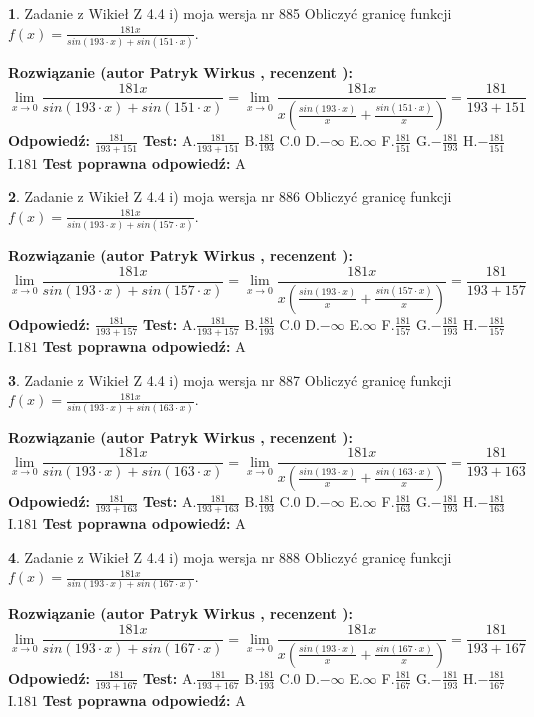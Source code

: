 \documentclass[12pt, a4paper]{article}
\theoremstyle{definition} %
\newtheorem{zad}{}
\newcommand{\zadStart}[1]{\begin{zad}#1\newline}
\newcommand{\zadStop}{\end{zad}}
\newcommand{\rozwStart}[2]{\noindent \textbf{Rozwiązanie (autor #1 , recenzent #2): }\newline}
\newcommand{\rozwStop}{\newline}
\newcommand{\odpStart}{\noindent \textbf{Odpowiedź:}\newline}
\newcommand{\odpStop}{\newline}
\newcommand{\testStart}{\noindent \textbf{Test:}\newline}
\newcommand{\testStop}{\newline}
\newcommand{\kluczStart}{\noindent \textbf{Test poprawna odpowiedź:}\newline}
\newcommand{\kluczStop}{\newline}
\begin{document}
\zadStart{Zadanie z Wikieł Z 4.4 i) moja wersja nr 885}
Obliczyć granicę funkcji $f(x)=\frac{181x}{sin(193\cdot x) +sin(151\cdot x)}$.
\zadStop
\rozwStart{Patryk Wirkus}{}
$$\lim\limits_{x\to 0}\frac{181x}{sin(193\cdot x) +sin(151\cdot x)}=\lim\limits_{x\to 0}\frac{181x}{x(\frac{sin(193\cdot x)}{x}+\frac{sin(151\cdot x)}{x})}=\frac{181}{193+151}$$
\rozwStop
\odpStart
$\frac{181}{193+151}$
\odpStop
\testStart
A.$\frac{181}{193+151}$
B.$\frac{181}{193}$
C.$0$
D.$-\infty$
E.$\infty$
F.$\frac{181}{151}$
G.$-\frac{181}{193}$
H.$-\frac{181}{151}$
I.$181$
\testStop
\kluczStart
A
\kluczStop



\zadStart{Zadanie z Wikieł Z 4.4 i) moja wersja nr 886}
Obliczyć granicę funkcji $f(x)=\frac{181x}{sin(193\cdot x) +sin(157\cdot x)}$.
\zadStop
\rozwStart{Patryk Wirkus}{}
$$\lim\limits_{x\to 0}\frac{181x}{sin(193\cdot x) +sin(157\cdot x)}=\lim\limits_{x\to 0}\frac{181x}{x(\frac{sin(193\cdot x)}{x}+\frac{sin(157\cdot x)}{x})}=\frac{181}{193+157}$$
\rozwStop
\odpStart
$\frac{181}{193+157}$
\odpStop
\testStart
A.$\frac{181}{193+157}$
B.$\frac{181}{193}$
C.$0$
D.$-\infty$
E.$\infty$
F.$\frac{181}{157}$
G.$-\frac{181}{193}$
H.$-\frac{181}{157}$
I.$181$
\testStop
\kluczStart
A
\kluczStop



\zadStart{Zadanie z Wikieł Z 4.4 i) moja wersja nr 887}
Obliczyć granicę funkcji $f(x)=\frac{181x}{sin(193\cdot x) +sin(163\cdot x)}$.
\zadStop
\rozwStart{Patryk Wirkus}{}
$$\lim\limits_{x\to 0}\frac{181x}{sin(193\cdot x) +sin(163\cdot x)}=\lim\limits_{x\to 0}\frac{181x}{x(\frac{sin(193\cdot x)}{x}+\frac{sin(163\cdot x)}{x})}=\frac{181}{193+163}$$
\rozwStop
\odpStart
$\frac{181}{193+163}$
\odpStop
\testStart
A.$\frac{181}{193+163}$
B.$\frac{181}{193}$
C.$0$
D.$-\infty$
E.$\infty$
F.$\frac{181}{163}$
G.$-\frac{181}{193}$
H.$-\frac{181}{163}$
I.$181$
\testStop
\kluczStart
A
\kluczStop



\zadStart{Zadanie z Wikieł Z 4.4 i) moja wersja nr 888}
Obliczyć granicę funkcji $f(x)=\frac{181x}{sin(193\cdot x) +sin(167\cdot x)}$.
\zadStop
\rozwStart{Patryk Wirkus}{}
$$\lim\limits_{x\to 0}\frac{181x}{sin(193\cdot x) +sin(167\cdot x)}=\lim\limits_{x\to 0}\frac{181x}{x(\frac{sin(193\cdot x)}{x}+\frac{sin(167\cdot x)}{x})}=\frac{181}{193+167}$$
\rozwStop
\odpStart
$\frac{181}{193+167}$
\odpStop
\testStart
A.$\frac{181}{193+167}$
B.$\frac{181}{193}$
C.$0$
D.$-\infty$
E.$\infty$
F.$\frac{181}{167}$
G.$-\frac{181}{193}$
H.$-\frac{181}{167}$
I.$181$
\testStop
\kluczStart
A
\kluczStop
\end{document}
